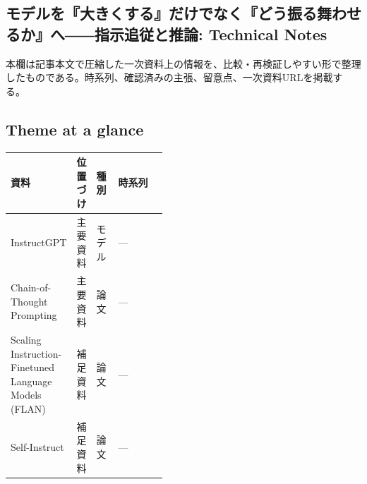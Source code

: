 \subsection*{モデルを『大きくする』だけでなく『どう振る舞わせるか』へ――指示追従と推論: Technical Notes}
本欄は記事本文で圧縮した一次資料上の情報を、比較・再検証しやすい形で整理したものである。時系列、確認済みの主張、留意点、一次資料URLを掲載する。
\medskip
\subsection*{Theme at a glance}
\begin{center}
\footnotesize
\begin{tabularx}{\linewidth}{@{}p{0.20\linewidth}p{0.10\linewidth}p{0.14\linewidth}X@{}}
\toprule
資料 & 位置づけ & 種別 & 時系列 \\
\midrule
InstructGPT & 主要資料 & モデル & — \\
Chain-of-Thought Prompting & 主要資料 & 論文 & — \\
Scaling Instruction-Finetuned Language Models (FLAN) & 補足資料 & 論文 & — \\
Self-Instruct & 補足資料 & 論文 & — \\
\bottomrule
\end{tabularx}
\end{center}
\normalsize

